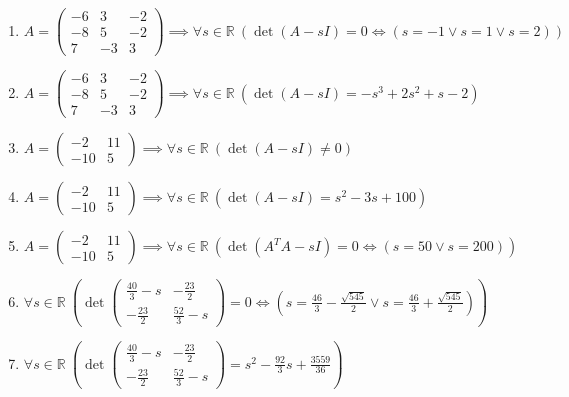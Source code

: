 \documentclass[11pt,a4paper]{article}
\begin{document}
\begin{enumerate}
\item $\displaystyle A = \begin{pmatrix} -6 & 3 & -2 \\ -8 & 5 & -2 \\ 7 & -3 & 3 \end{pmatrix} \implies \forall s \in \mathbb{R}\ \left( \det\left( A - sI \right) = 0 \iff \left( s = -1 \lor s = 1 \lor s = 2 \right) \right)$
\item $\displaystyle A = \begin{pmatrix} -6 & 3 & -2 \\ -8 & 5 & -2 \\ 7 & -3 & 3 \end{pmatrix} \implies \forall s \in \mathbb{R}\ \left( \det\left( A - sI \right) = -s^{3} + 2s^{2} + s - 2 \right)$
\item $\displaystyle A = \begin{pmatrix} -2 & 11 \\ -10 & 5 \end{pmatrix} \implies \forall s \in \mathbb{R}\ \left( \det\left( A - sI \right) \neq 0 \right)$
\item $\displaystyle A = \begin{pmatrix} -2 & 11 \\ -10 & 5 \end{pmatrix} \implies \forall s \in \mathbb{R}\ \left( \det\left( A - sI \right) = s^{2} - 3s + 100 \right)$
\item $\displaystyle A = \begin{pmatrix} -2 & 11 \\ -10 & 5 \end{pmatrix} \implies \forall s \in \mathbb{R}\ \left( \det\left( A^{T} A - sI \right) = 0 \iff \left( s = 50 \lor s = 200 \right) \right)$
\item $\displaystyle \forall s \in \mathbb{R}\ \left( \det \begin{pmatrix} \frac{40}{3} - s & -\frac{23}{2} \\ -\frac{23}{2} & \frac{52}{3} - s \end{pmatrix} = 0 \iff \left( s = \frac{46}{3} - \frac{\sqrt{545}}{2} \lor s = \frac{46}{3} + \frac{\sqrt{545}}{2} \right) \right)$
\item $\displaystyle \forall s \in \mathbb{R}\ \left( \det \begin{pmatrix} \frac{40}{3} - s & -\frac{23}{2} \\ -\frac{23}{2} & \frac{52}{3} - s \end{pmatrix} = s^{2} - \frac{92}{3} s + \frac{3559}{36} \right)$

\end{enumerate}
\end{document}
